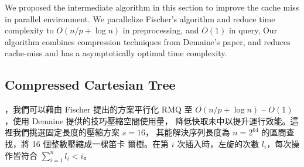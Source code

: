 



We proposed the intermediate algorithm in this section to improve the
cache miss in parallel environment.  We parallelize Fischer's
algorithm and reduce time complexity to $O(n / p + \log n)$ in
preprocessing, and $O(1)$ in query, Our algorithm combines compression
techniques from Demaine's paper, and reduces cache-miss and has a
asymptotically optimal time complexity.

\subsection{Compressed Cartesian Tree}

\iffalse 在 Fischer \cite{fischer} 的論文中，根據卡塔蘭數
$\frac{1}{s+1}\binom{2s}{s} = O(\frac{4^s}{s^{1.5}})$ 建立查找表
(lookup-table)，其中選擇 $s = \frac{1}{4} \log n$ 時，空間複雜度
$O(s^2 \frac{4^s}{s^{1.5}}) = o(n)$ 且建表複雜度 $o(n)$。每一個區間詢
問將會拆成 2 個 super-block 和 2 個 in-block 詢問，共計需要 4 次的記憶
體存取。在理論分析上，離線 RMQ 問題可在 $\theta(n)$ -- $\theta(1)$ 時
間內解決任一詢問。當 $n$ 越大時，這 4 次的記憶體存取會遭遇到嚴重的快取
未中 (cache miss)，在 Demaine ~\cite{demaine} 的論文中，發展出快取忘卻
(cache oblivious) 形式的查找方案，降低在離線版本中的 in-block 詢問產生
的快取未中。\fi


，我們可以藉由 Fischer 提出的方案平行化 RMQ 至
$O(n / p + \log n)$ -- $O(1)$，使用 Demaine 提供的技巧壓縮空間使用量，
降低快取未中以提升運行效能。這裡我們挑選固定長度的壓縮方案 $s = 16$，
其能解決序列長度為 $n = 2^{64}$ 的區間查找，將 16 個整數壓縮成一棵笛卡
爾樹。在第 $i$ 次插入時，左旋的次數 $l_i$，每次操作皆符合
$\sum_{i=1}^{n} l_i < i$。\fi

